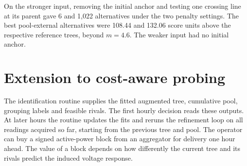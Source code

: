 \documentclass[journal,onecolumn,11pt]{IEEEtran}
\begin{document}
On the stronger input, removing the initial anchor and testing one crossing line at its parent gave 6 and
1,022 alternatives under the two penalty settings. The best pool-external alternatives were 108.44 and 132.06
score units above the respective reference trees, beyond $m=4.6$. The weaker input had no initial anchor.

\section{Extension to cost-aware probing}\label{sec:probe}

The identification routine supplies the fitted augmented tree, cumulative pool, grouping labels and feasible
rivals. The first hourly decision reads these outputs. At later hours the routine updates the fits and reruns the
refinement loop on all readings acquired so far, starting from the previous tree and pool. The operator can buy a
signed active-power block from an aggregator for delivery one hour ahead. The value of a block depends on how
differently the current tree and its rivals predict the induced voltage response.
\end{document}
